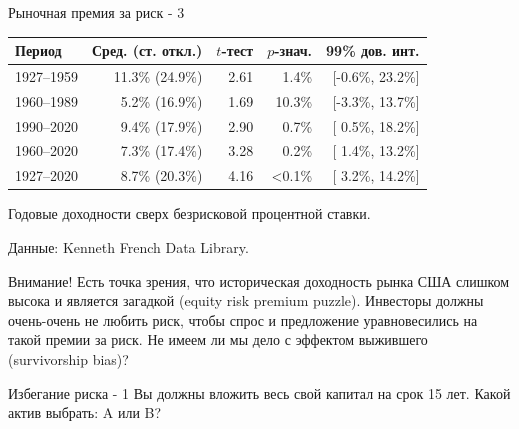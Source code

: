 \documentclass{beamer}
\begin{document}
\begin{frame}{Рыночная премия за риск - 3}
\centering
\begin{tabular}{l|r|r|r|r}
Период & Сред. (ст. откл.) & $t$-тест & $p$-знач. & 99\% дов. инт. \\
\hline
1927--1959 & 11.3\% (24.9\%) & 2.61 &  1.4\% & [-0.6\%, 23.2\%] \\
1960--1989 &  5.2\% (16.9\%) & 1.69 & 10.3\% & [-3.3\%, 13.7\%] \\
1990--2020 &  9.4\% (17.9\%) & 2.90 &  0.7\% & [ 0.5\%, 18.2\%] \\
1960--2020 &  7.3\% (17.4\%) & 3.28 &  0.2\% & [ 1.4\%, 13.2\%] \\ \hline
1927--2020 &  8.7\% (20.3\%) & 4.16 & <0.1\% & [ 3.2\%, 14.2\%] 
\end{tabular}
{\scriptsize Годовые доходности сверх безрисковой процентной ставки.

Данные: Kenneth French Data Library.}

\justify
Внимание! Есть точка зрения, что историческая доходность рынка США слишком высока и является загадкой (equity risk premium puzzle). Инвесторы должны очень-очень не любить риск, чтобы спрос и предложение уравновесились на такой премии за риск. Не имеем ли мы дело с эффектом выжившего (survivorship bias)?
\end{frame}



\begin{frame}{Избегание риска - 1}
\justify
Вы должны вложить весь свой капитал на срок 15 лет. Какой актив выбрать: A или
B?

\centering
{}
\end{frame}
\end{document}
